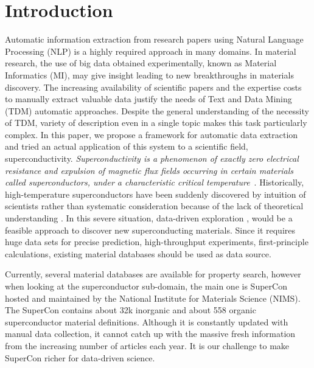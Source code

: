 \documentclass{article}[a4]
\begin{document}
\section{Introduction}
Automatic information extraction from research papers using Natural Language Processing (NLP) is a highly required approach in many domains. In material research, the use of big data obtained experimentally, known as Material Informatics (MI), may give insight leading to new breakthroughs in materials discovery. 
The increasing availability of scientific papers and the expertise costs to manually extract valuable data justify the needs of Text and Data Mining (TDM) automatic approaches. Despite the general understanding of the necessity of TDM, variety of description even in a single topic makes this task particularly complex. 
In this paper, we propose a framework for automatic data extraction and tried an actual application of this system to a scientific field, superconductivity.  
\textit{Superconductivity is a phenomenon of exactly zero electrical resistance and expulsion of magnetic flux fields occurring in certain materials called superconductors, under a characteristic critical temperature}~\cite{wikipedia:superconductivity}. 
Historically, high-temperature superconductors have been suddenly discovered by intuition of scientists rather than systematic consideration because of the lack of theoretical understanding \cite{klintenberg2013possible} \cite{DBLP:journals/corr/abs-1812-01995}. In this severe situation, data-driven exploration \cite{doi:10.1080/14686996.2018.1548885}, \cite{HAMIDIEH2018346} \cite{PhysRevMaterials.2.024802} \cite{doi:10.1021/cm503507h} would be a feasible approach to discover new superconducting materials. Since it requires huge data sets for precise prediction, high-throughput experiments, first-principle calculations, existing material databases should be used as data source. 

Currently, several material databases are available for property search, however when looking at the superconductor sub-domain, the main one is SuperCon~\cite{SuperCon} hosted and maintained by the National Institute for Materials Science (NIMS). The SuperCon contains about 32k inorganic and about 558 organic superconductor material definitions. Although it is constantly updated with manual data collection, it cannot catch up with the massive fresh information from the increasing number of articles each year. It is our challenge to make SuperCon richer for data-driven science.
\end{document}
